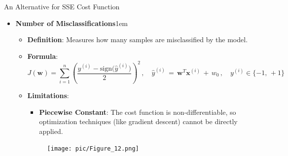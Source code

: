 \documentclass[serif, aspectratio=169]{beamer}
\begin{document}
\begin{frame}{An Alternative for SSE Cost Function}
    \begin{itemize}
        \item \textbf{Number of Misclassifications}\itemsep1em
        \medskip
        \begin{itemize}\itemsep0.8em
            \item \textbf{Definition}:
            Measures how many samples are misclassified by the model.
            \item \textbf{Formula}:
                \[
                J(\mathbf{w}) = \sum_{i=1}^{n} (\frac{y^{(i)} - \text{sign(\(\hat{y}^{(i)})\)}}{2})^2 \, , \quad \hat{y}^{(i)} \, = \, \mathbf{w}^T\mathbf{x}^{(i)} \, + \, w_0 \, , \quad y^{(i)} \in \{-1, \, +1\}
                \]
            \item \textbf{Limitations}: \\
            \begin{itemize}
                \item \justifying \textbf{Piecewise Constant}:
                The cost function is non-differentiable, so optimization techniques (like gradient descent) cannot be directly applied.
            \end{itemize}
            \endminipage
            \hspace{1cm}
            \begin{figure}[bh]
                \texttt{[image: pic/Figure\_12.png]}
            \end{figure}
            \endminipage
        \end{itemize}
    \end{itemize}
    \vfill
\end{frame}
\end{document}

